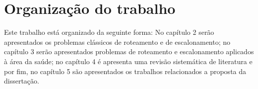 \section{Organização do trabalho}
Este trabalho está organizado da seguinte forma: No capítulo 2 serão apresentados os problemas clássicos de roteamento e de escalonamento; no capítulo 3 serão apresentados problemas de roteamento e escalonamento aplicados à área da saúde; no capítulo 4 é apresenta uma revisão sistemática de literatura e por fim, no capítulo 5 são apresentados os trabalhos relacionados a proposta da dissertação. 
    



 



  	
